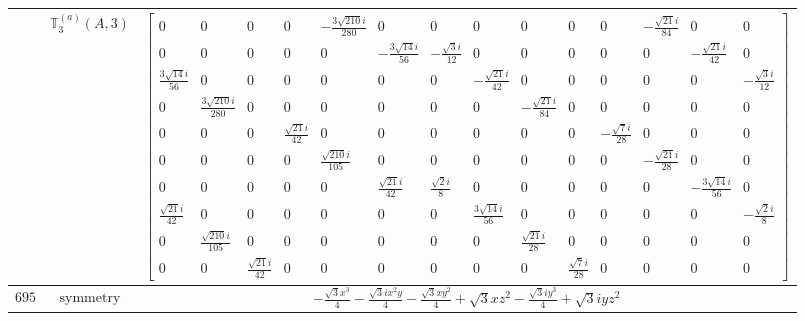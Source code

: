 \documentclass[fleqn,8pt,landscape]{jsarticle}
\begin{document}
\begin{longtable}{ccc}
$  $ & $ \mathbb{T}_{3}^{(a)}(A,3) $ & $ \begin{bmatrix} 0 & 0 & 0 & 0 & - \frac{3 \sqrt{210} i}{280} & 0 & 0 & 0 & 0 & 0 & 0 & - \frac{\sqrt{21} i}{84} & 0 & 0 \\ 0 & 0 & 0 & 0 & 0 & - \frac{3 \sqrt{14} i}{56} & - \frac{\sqrt{3} i}{12} & 0 & 0 & 0 & 0 & 0 & - \frac{\sqrt{21} i}{42} & 0 \\ \frac{3 \sqrt{14} i}{56} & 0 & 0 & 0 & 0 & 0 & 0 & - \frac{\sqrt{21} i}{42} & 0 & 0 & 0 & 0 & 0 & - \frac{\sqrt{3} i}{12} \\ 0 & \frac{3 \sqrt{210} i}{280} & 0 & 0 & 0 & 0 & 0 & 0 & - \frac{\sqrt{21} i}{84} & 0 & 0 & 0 & 0 & 0 \\ 0 & 0 & 0 & \frac{\sqrt{21} i}{42} & 0 & 0 & 0 & 0 & 0 & 0 & - \frac{\sqrt{7} i}{28} & 0 & 0 & 0 \\ 0 & 0 & 0 & 0 & \frac{\sqrt{210} i}{105} & 0 & 0 & 0 & 0 & 0 & 0 & - \frac{\sqrt{21} i}{28} & 0 & 0 \\ 0 & 0 & 0 & 0 & 0 & \frac{\sqrt{21} i}{42} & \frac{\sqrt{2} i}{8} & 0 & 0 & 0 & 0 & 0 & - \frac{3 \sqrt{14} i}{56} & 0 \\ \frac{\sqrt{21} i}{42} & 0 & 0 & 0 & 0 & 0 & 0 & \frac{3 \sqrt{14} i}{56} & 0 & 0 & 0 & 0 & 0 & - \frac{\sqrt{2} i}{8} \\ 0 & \frac{\sqrt{210} i}{105} & 0 & 0 & 0 & 0 & 0 & 0 & \frac{\sqrt{21} i}{28} & 0 & 0 & 0 & 0 & 0 \\ 0 & 0 & \frac{\sqrt{21} i}{42} & 0 & 0 & 0 & 0 & 0 & 0 & \frac{\sqrt{7} i}{28} & 0 & 0 & 0 & 0 \end{bmatrix} $ \\ \hline
$ 695 $ & $ \text{symmetry} $ & $ - \frac{\sqrt{3} x^{3}}{4} - \frac{\sqrt{3} i x^{2} y}{4} - \frac{\sqrt{3} x y^{2}}{4} + \sqrt{3} x z^{2} - \frac{\sqrt{3} i y^{3}}{4} + \sqrt{3} i y z^{2} $ \\

\end{longtable}
\end{document}
